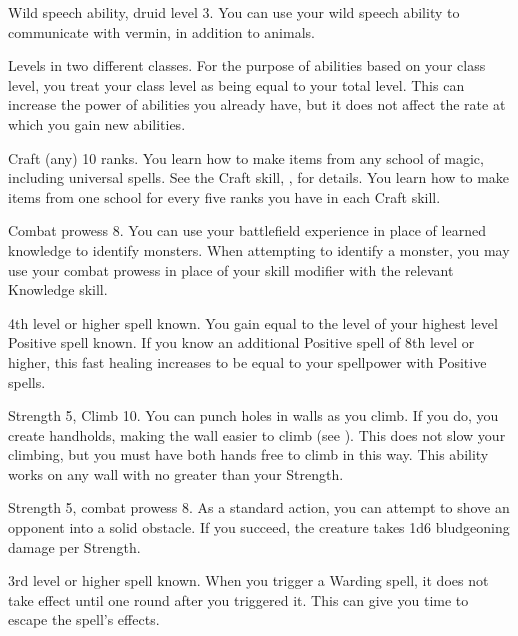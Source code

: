 \featpre Wild speech ability, druid level 3.
\featben You can use your wild speech ability to communicate with vermin, in addition to animals.

\featpre Levels in two different classes.
\featben For the purpose of abilities based on your class level, you treat your class level as being equal to your total level.
This can increase the power of abilities you already have, but it does not affect the rate at which you gain new abilities.

\featpre Craft (any) 10 ranks.
\featben You learn how to make items from any school of magic, including universal spells.
See the Craft skill, , for details.
You learn how to make items from one school for every five ranks you have in each Craft skill.

\featpre Combat prowess 8.
\featben You can use your battlefield experience in place of learned knowledge to identify monsters.
When attempting to identify a monster, you may use your combat prowess in place of your skill modifier with the relevant Knowledge skill.

\featpre 4th level or higher  spell known.
\featben You gain  equal to the level of your highest level Positive spell known.
If you know an additional Positive spell of 8th level or higher, this fast healing increases to be equal to your spellpower with Positive spells.

\featpres Strength 5, Climb 10.
\featben You can punch holes in walls as you climb.
If you do, you create handholds, making the wall easier to climb (see ).
This does not slow your climbing, but you must have both hands free to climb in this way.
This ability works on any wall with  no greater than your Strength.

\featpres Strength 5, combat prowess 8.
\featben As a standard action, you can attempt to shove an opponent into a solid obstacle.
If you succeed, the creature takes 1d6 bludgeoning damage per Strength.

\featpre 3rd level or higher  spell known.
\featben When you trigger a Warding spell, it does not take effect until one round after you triggered it. This can give you time to escape the spell's effects.

